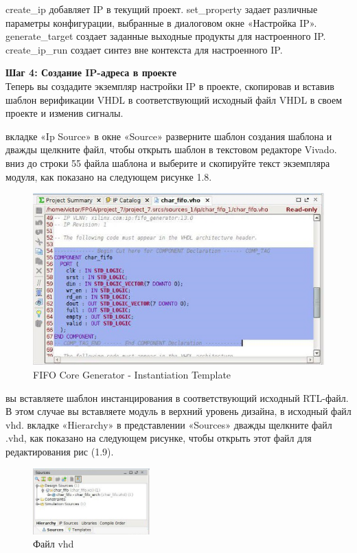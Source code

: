 \begin{itemize}
 create\_ip добавляет IP в текущий проект.
 set\_property задает различные параметры конфигурации, выбранные в диалоговом окне «Настройка IP».
 generate\_target создает заданные выходные продукты для настроенного IP.
 create\_ip\_run создает синтез вне контекста для настроенного IP.
\end{itemize}

\textbf{Шаг 4: Создание IP-адреса в проекте} \\ 
Теперь вы создадите экземпляр настройки IP в проекте, скопировав и вставив шаблон верификации VHDL в соответствующий исходный файл VHDL в своем проекте и изменив сигналы.
\begin{enumerate}
 вкладке «Ip Source»  в окне «Source» разверните шаблон создания шаблона и дважды щелкните файл, чтобы открыть шаблон в текстовом редакторе Vivado.
 вниз до строки 55 файла шаблона и выберите и скопируйте текст экземпляра модуля, как показано на следующем рисунке 1.8.
\begin{figure}[h]
\centering
\includegraphics[width=1.1\textwidth]{fifo_ip_8}
\caption{FIFO Core Generator - Instantiation Template}
\label{fifo_ip_8_label}
\end{figure}
 вы вставляете шаблон инстанцирования в соответствующий исходный RTL-файл. В этом случае вы вставляете модуль в верхний уровень дизайна, в исходный файл vhd.
 вкладке «Hierarchy» в представлении «Sources» дважды щелкните файл .vhd, как показано на следующем рисунке, чтобы открыть этот файл для редактирования рис (1.9).

\begin{figure}[h]
\centering
\includegraphics[width=0.4\textwidth]{fifo_ip_9}
\caption{Файл vhd}
\label{fifo_ip_9_label}
\end{figure}


\end{enumerate}
